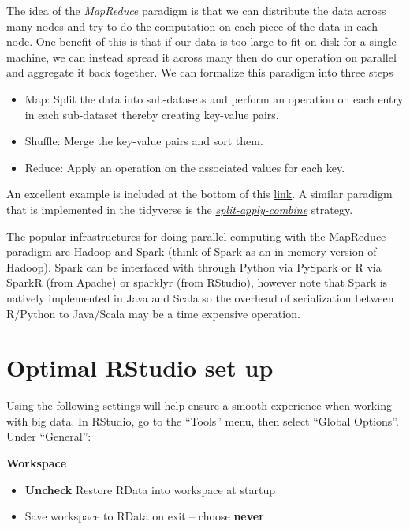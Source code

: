 \documentclass[]{book}
\providecommand{\tightlist}{%
  \setlength{\itemsep}{0pt}\setlength{\parskip}{0pt}}
\begin{document}
The idea of the \emph{MapReduce} paradigm is that we can distribute the data across many nodes and try to do the computation on each piece of the data in each node. One benefit of this is that if our data is too large to fit on disk for a single machine, we can instead spread it across many then do our operation on parallel and aggregate it back together. We can formalize this paradigm into three steps

\begin{itemize}
\tightlist
\item
  Map: Split the data into sub-datasets and perform an operation on each entry in each sub-dataset thereby creating key-value pairs.
\item
  Shuffle: Merge the key-value pairs and sort them.
\item
  Reduce: Apply an operation on the associated values for each key.
\end{itemize}

An excellent example is included at the bottom of this \href{https://www.journaldev.com/8848/mapreduce-algorithm-example}{link}. A similar paradigm that is implemented in the tidyverse is the \href{https://www.jstatsoft.org/article/view/v040i01}{\emph{split-apply-combine}} strategy.

The popular infrastructures for doing parallel computing with the MapReduce paradigm are Hadoop and Spark (think of Spark as an in-memory version of Hadoop). Spark can be interfaced with through Python via PySpark or R via SparkR (from Apache) or sparklyr (from RStudio), however note that Spark is natively implemented in Java and Scala so the overhead of serialization between R/Python to Java/Scala may be a time expensive operation.

\hypertarget{optimal-rstudio-set-up}{%
\section{Optimal RStudio set up}\label{optimal-rstudio-set-up}}

Using the following settings will help ensure a smooth experience when working with big data. In RStudio, go to the ``Tools'' menu, then select ``Global Options''. Under ``General'':

\textbf{Workspace}

\begin{itemize}
\tightlist
\item
  \textbf{Uncheck} Restore RData into workspace at startup
\item
  Save workspace to RData on exit -- choose \textbf{never}
\end{itemize}
\end{document}
